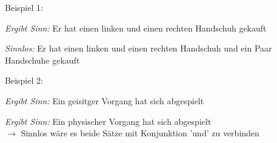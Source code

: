 \documentclass[landscape, twocolumn]{scrartcl}
\begin{document}
\smallskip
\noindent Beispiel 1:

\textit{Ergibt Sinn:} \glqq Er hat einen linken und einen rechten Handschuh gekauft \grqq

\textit{Sinnlos:} \glqq  Er hat einen linken und einen rechten Handschuh und ein Paar Handschuhe gekauft \grqq

\medskip
\noindent Beispiel 2:

\textit{Ergibt Sinn:} \glqq Ein geisitger Vorgang hat sich abgespielt  \grqq

\textit{Ergibt Sinn:} \glqq Ein physischer Vorgang hat sich abgespielt \grqq\\
$\rightarrow$ Sinnlos wäre es beide Sätze mit Konjunktion 'und' zu verbinden
\end{document}

